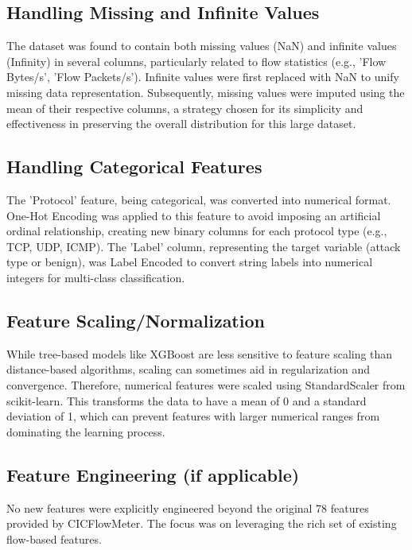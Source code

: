 \subsection{Handling Missing and Infinite Values} The dataset was found to contain both missing values (NaN) and infinite values (Infinity) in several columns, particularly related to flow statistics (e.g., 'Flow Bytes/s', 'Flow Packets/s'). Infinite values were first replaced with NaN to unify missing data representation. Subsequently, missing values were imputed using the mean of their respective columns, a strategy chosen for its simplicity and effectiveness in preserving the overall distribution for this large dataset.

\subsection{Handling Categorical Features}
The 'Protocol' feature, being categorical, was converted into numerical format. One-Hot Encoding was applied to this feature to avoid imposing an artificial ordinal relationship, creating new binary columns for each protocol type (e.g., TCP, UDP, ICMP). The 'Label' column, representing the target variable (attack type or benign), was Label Encoded to convert string labels into numerical integers for multi-class classification.

\subsection{Feature Scaling/Normalization}
While tree-based models like XGBoost are less sensitive to feature scaling than distance-based algorithms, scaling can sometimes aid in regularization and convergence. Therefore, numerical features were scaled using StandardScaler from scikit-learn. This transforms the data to have a mean of 0 and a standard deviation of 1, which can prevent features with larger numerical ranges from dominating the learning process.

\subsection{Feature Engineering (if applicable)}
No new features were explicitly engineered beyond the original 78 features provided by CICFlowMeter. The focus was on leveraging the rich set of existing flow-based features.

